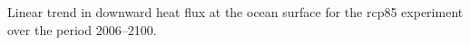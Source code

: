 \label{fig:hfds}
Linear trend in downward heat flux at the ocean surface for the rcp85 experiment over the period 2006--2100.